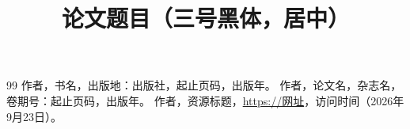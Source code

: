 \documentclass[bwprint,fontset=fandol]{gmcmthesis}
\title{论文题目（三号黑体，居中）}
\begin{document}
\maketitle



\pagestyle{plain}










%

\begin{thebibliography}{99}
 作者，书名，出版地：出版社，起止页码，出版年。
 作者，论文名，杂志名，卷期号：起止页码，出版年。
 作者，资源标题，\url{https://网址}，访问时间（2026年9月23日）。  %
\end{thebibliography}


\end{document}
